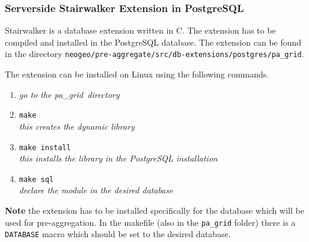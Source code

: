 \subsubsection{Serverside Stairwalker Extension in PostgreSQL}
\label{sec:serversideextension}

Stairwalker is a database extension written in C.  The extension has to be
compiled and installed in the PostgreSQL database. The extension can be
found in the directory
\lstinline|neogeo/pre-aggregate/src/db-extensions/postgres/pa_grid|.

The extension can be installed on Linux using the following commands.
\begin{enumerate}[noitemsep]
	\item \textit{go to the pa\_grid\ directory}
	\item \lstinline|make| \\ \textit{this creates the dynamic library}
	\item \lstinline|make install| \\ \textit{this installs the library in
		the PostgreSQL installation}
	\item \lstinline|make sql| \\ \textit{declare the module in the desired
		database}
\end{enumerate}

\noindent\textbf{Note} the extension has to be installed specifically for
the database which will be used for pre-aggregation. In the makefile (also
in the \lstinline|pa_grid| folder) there is a \lstinline|DATABASE| macro
which should be set to the desired database.

